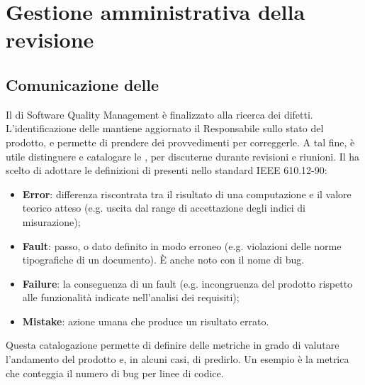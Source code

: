 \newpage
\section{Gestione amministrativa della revisione}
\subsection{Comunicazione delle }
Il  di Software Quality Management è finalizzato alla ricerca dei difetti. L'identificazione delle  mantiene aggiornato il Responsabile sullo stato del prodotto, e permette di prendere dei provvedimenti per correggerle. A tal fine, è utile distinguere e catalogare le , per discuterne durante revisioni e riunioni. Il  ha scelto di adottare le definizioni di  presenti nello standard IEEE 610.12-90:
\begin{itemize}
\item \textbf{Error}: differenza riscontrata tra il risultato di una computazione e il valore teorico atteso (e.g. uscita dal range di accettazione degli indici di misurazione);
\item \textbf{Fault}: passo,  o dato definito in modo erroneo (e.g. violazioni delle norme tipografiche di un documento). \`E anche noto con il nome di bug.
\item \textbf{Failure}: la conseguenza di un fault (e.g. incongruenza del prodotto rispetto alle funzionalità indicate nell'analisi dei requisiti);
\item \textbf{Mistake}: azione umana che produce un risultato errato.
\end{itemize}
Questa catalogazione permette di definire delle metriche in grado di valutare l'andamento del prodotto e, in alcuni casi, di predirlo. Un esempio è la metrica che conteggia il numero di bug per linee di codice.

